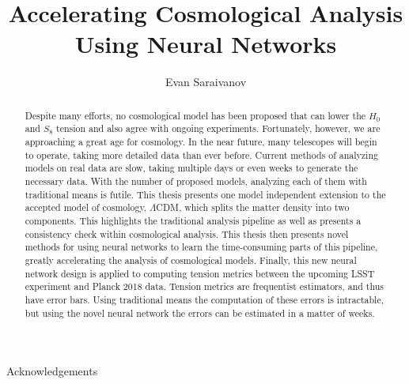 \documentclass[master,bottom,nosig]{usbthesis}
\author{Evan Saraivanov}%
\title{Accelerating Cosmological Analysis Using Neural Networks}%
\theoremstyle{definition}
\theoremstyle{plain} %
\begin{document}
\singlespacing %
\maketitle %
\makeapproval %

\begin{abstract}
Despite many efforts, no cosmological model has been proposed that can lower the $H_0$ and $S_8$ tension and also agree with ongoing experiments. Fortunately, however, we are approaching a great age for cosmology. In the near future, many telescopes will begin to operate, taking more detailed data than ever before. Current methods of analyzing models on real data are slow, taking multiple days or even weeks to generate the necessary data. With the number of proposed models, analyzing each of them with traditional means is futile. This thesis presents one model independent extension to the accepted model of cosmology, $\Lambda$CDM, which splits the matter density into two components. This highlights the traditional analysis pipeline as well as presents a consistency check within cosmological analysis. This thesis then presents novel methods for using neural networks to learn the time-consuming parts of this pipeline, greatly accelerating the analysis of cosmological models. Finally, this new neural network design is applied to computing tension metrics between the upcoming LSST experiment and Planck 2018 data. Tension metrics are frequentist estimators, and thus have error bars. Using traditional means the computation of these errors is intractable, but using the novel neural network the errors can be estimated in a matter of weeks.
\end{abstract}
\tableofcontents %
\listoffigures %
%
%
\begin{acknowledgements}
Acknowledgements
\end{acknowledgements}
\pagestyle{thesis}
\newpage
{}







{}
\renewcommand{\baselinestretch}{1}
\normalsize

\clearpage
\newpage
{}%
%


\clearpage
\newpage

\appendix

%
\end{document}
